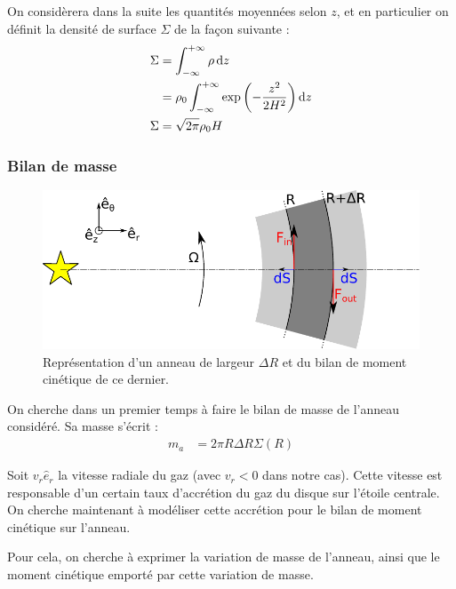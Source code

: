 \bigskip

On considèrera dans la suite les quantités moyennées selon $z$, et en particulier on définit la densité de surface $\Sigma$ de
la façon suivante : 
\begin{align}
\Sigma &= \int_{-\infty}^{+\infty} \rho \dif z\nonumber\\
&=\rho_0 \int_{-\infty}^{+\infty}  \exp\left(-\frac{z^2}{2H^2}\right)\dif z\nonumber\\
\Sigma &= \sqrt{2\pi}\rho_0 H\label{eq:surface-to-volume}
\end{align}


\subsubsection{Bilan de masse}
\begin{figure}[htbp]
\centering
\includegraphics[width=0.7\linewidth]{figure/disk_ring.pdf}
\caption[Bilan de moment cinétique d'un anneau d'épaisseur $\Delta R$.]{Représentation d'un anneau de largeur $\Delta R$ et du
bilan de moment cinétique de ce dernier.}\label{fig:disk_ring}
\end{figure}

On cherche dans un premier temps à faire le bilan de masse de l'anneau considéré. Sa masse s'écrit :
\begin{align}
m_a &= 2\pi R \Delta R \Sigma(R)\label{eq:m_a}
\end{align}

\bigskip

Soit $v_r\hat{e}_r$ la vitesse radiale du gaz (avec $v_r<0$ dans notre cas). Cette vitesse est responsable d'un certain taux d'accrétion du gaz du disque sur l'étoile centrale. On cherche maintenant à modéliser cette accrétion pour le bilan de moment cinétique sur l'anneau.

Pour cela, on cherche à exprimer la variation de masse de l'anneau, ainsi que le moment cinétique emporté par cette variation de masse. 

